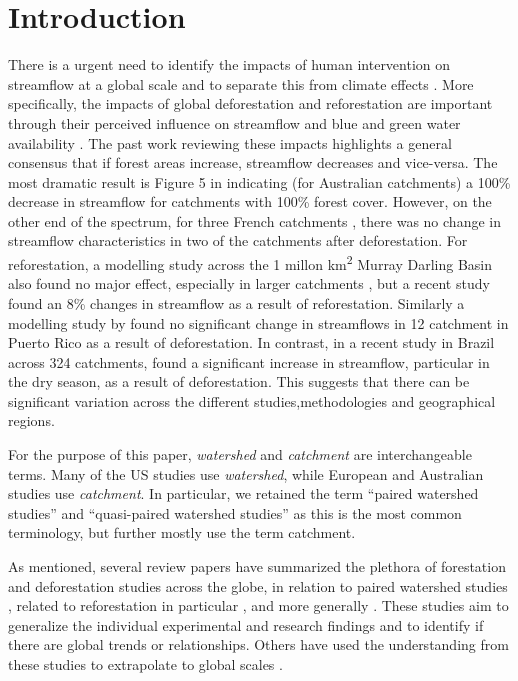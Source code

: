 \documentclass[]{elsarticle} %
\begin{document}
\hypertarget{introduction}{%
\section{Introduction}\label{introduction}}

There is a urgent need to identify the impacts of human intervention on streamflow at a global scale and to separate this from climate effects \citep{wang2020, hoekvandijke2022}. More specifically, the impacts of global deforestation and reforestation are important through their perceived influence on streamflow and blue and green water availability \citep{hoekvandijke2022, schyns2019}. The past work reviewing these impacts \citep{andreassian2004, jackson2005, zhang2017, brown2005, brown2013, filoso2017} highlights a general consensus that if forest areas increase, streamflow decreases and vice-versa. The most dramatic result is Figure 5 in \citet{zhang2011} indicating (for Australian catchments) a 100\% decrease in streamflow for catchments with 100\% forest cover. However, on the other end of the spectrum, for three French catchments \citep{cosandey2005}, there was no change in streamflow characteristics in two of the catchments after deforestation. For reforestation, a modelling study across the 1 millon km\textsuperscript{2} Murray Darling Basin also found no major effect, especially in larger catchments \citep{vandijk2007}, but a recent study \citep{hoekvandijke2022} found an 8\% changes in streamflow as a result of reforestation. Similarly a modelling study by \citet{beck2013} found no significant change in streamflows in 12 catchment in Puerto Rico as a result of deforestation. In contrast, in a recent study in Brazil across 324 catchments, \citet{levy2018} found a significant increase in streamflow, particular in the dry season, as a result of deforestation. This suggests that there can be significant variation across the different studies,methodologies and geographical regions.

For the purpose of this paper, \emph{watershed} and \emph{catchment} are interchangeable terms. Many of the US studies use \emph{watershed}, while European and Australian studies use \emph{catchment}. In particular, we retained the term ``paired watershed studies'' and ``quasi-paired watershed studies'' as this is the most common terminology, but further mostly use the term catchment.

As mentioned, several review papers have summarized the plethora of forestation and deforestation studies across the globe, in relation to paired watershed studies \citep{brown2005, hewlett1984}, related to reforestation in particular \citep{filoso2017}, and more generally \citep{jackson2005, zhang2017}. These studies aim to generalize the individual experimental and research findings and to identify if there are global trends or relationships. Others have used the understanding from these studies to extrapolate to global scales \citep{hoekvandijke2022}.
\end{document}
